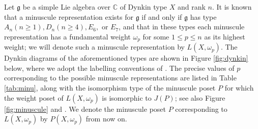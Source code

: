 \documentclass[11pt]{amsart}
\theoremstyle{plain}
\theoremstyle{definition}
\theoremstyle{remark}
\numberwithin{equation}{section}
\newcommand{\C}{{\mathbb C}}
\newcommand{\fg}{{\mathfrak g}}
\newcommand{\lxp}{L(X,\omega_p)}
\newcommand{\pxp}{P(X,\omega_p)}
\begin{document}
Let $\fg$ be a simple Lie algebra over $\C$ of Dynkin type $X$ and rank $n$.  It
is known that a minuscule representation exists for $\fg$ if and only if $\fg$
has type $A_{n} (n\ge 1), D_n (n\ge 4), E_6,$ or $E_7$, and that in these types
each minuscule representation has a fundamental weight $\omega_p$ for some $1\le
p\le n$ as its highest weight; we will denote such a minuscule representation by
$\lxp$.  The Dynkin diagrams of the aforementioned types are shown in Figure
\ref{fig:dynkin} below, where we adopt the labelling conventions of
\cite[Chapter 4]{kac90}. The precise values of $p$ corresponding to the possible
minuscule representations are listed in Table \ref{tab:minu}, along with the
isomorphism type of the minuscule poset $P$ for which the weight poset of $\lxp$
is isomorphic to $J(P)$; see also Figure \ref{fig:minuscule} and \cite[Theorem
8.3.10 (v)]{green13}.  We denote the minuscule poset $P$ corresponding to $\lxp$
by $\pxp$ from now on.
\end{document}
